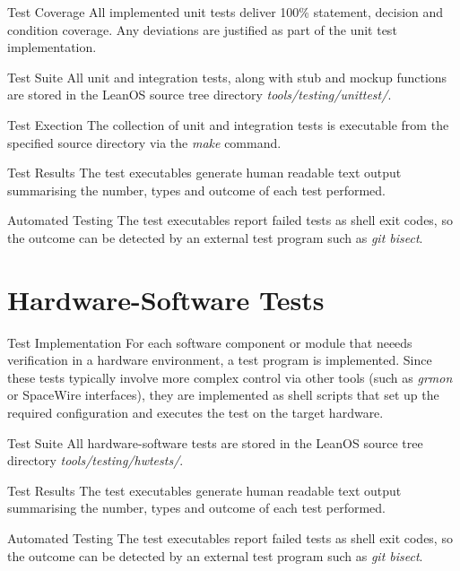 {Test Coverage}{%
All implemented unit tests deliver 100\% statement, decision and condition
coverage. Any deviations are justified as part of the unit test implementation.
}%
{}{}

{Test Suite}{%
All unit and integration tests, along with stub and mockup functions are stored
in the LeanOS source tree directory \mbox{\emph{tools/testing/unittest/}}.
}%
{}{}

{Test Exection}{%
The collection of unit and integration tests is executable from the specified
source directory via the \emph{make} command.
}%
{}{}


{Test Results}{%
The test executables generate human readable text output summarising the number,
types and outcome of each test performed.
}%
{}{}


{Automated Testing}{%
The test executables report failed tests as shell exit codes, so the outcome
can be detected by an external test program such as \emph{git bisect}.
}%
{}{}




\section{Hardware-Software Tests}

{Test Implementation}{%
For each software component or module that neeeds verification in a hardware
environment, a test program is implemented.
}%
{}{Since these tests typically involve more complex control %
via other tools (such as \emph{grmon} or \gls{SpaceWire} interfaces), they are %
implemented as shell scripts that set up the required configuration and %
executes the test on the target hardware. %
}


{Test Suite}{%
All hardware-software tests are stored in the LeanOS source
tree directory \mbox{\emph{tools/testing/hwtests/}}.%
}%
{}{}


{Test Results}{%
The test executables generate human readable text output summarising the number,
types and outcome of each test performed.
}%
{}{}


{Automated Testing}{%
The test executables report failed tests as shell exit codes, so the outcome
can be detected by an external test program such as \emph{git bisect}.
}%
{}{}


